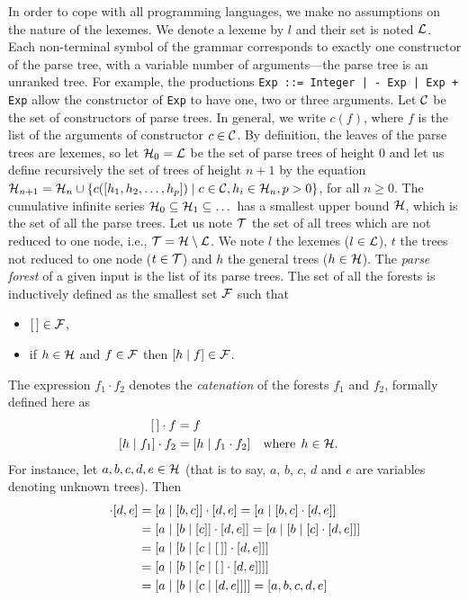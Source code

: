 In order to cope with all programming languages, we make no
assumptions on the nature of the lexemes. We denote a lexeme by \(l\)
and their set is noted \(\cal L\). Each non\hyp{}terminal symbol of
the grammar corresponds to exactly one constructor of the parse tree,
with a variable number of arguments---the parse tree is an unranked
tree. For example, the productions
\verb/Exp ::= Integer | - Exp | Exp + Exp/ allow the constructor of
\texttt{Exp} to have one, two or three arguments. Let \({\cal C}\) be
the set of constructors of parse trees. In general, we write \(c(f)\),
where \(f\) is the list of the arguments of constructor \(c \in {\cal
  C}\). By definition, the leaves of the parse trees are lexemes, so
let \({\cal H}_0 = {\cal L}\) be the set of parse trees of height
\(0\) and let us define recursively the set of trees of height \(n+1\)
by the equation \({\cal H}_{n+1} = {\cal H}_n \cup \{c([h_1, h_2,
  \dots, h_p]) \mid c \in {\cal C}, h_i \in {\cal H}_n, p > 0\}\), for
all \(n \geqslant 0\). The cumulative infinite series \({\cal H}_0
\subseteq {\cal H}_1 \subseteq \dots\) has a smallest upper bound
\(\cal H\), which is the set of all the parse trees. Let us note
\(\cal T\) the set of all trees which are not reduced to one node,
i.e., \({\cal T} = {\cal H} \setminus {\cal L}\). We note \(l\) the
lexemes (\(l \in {\cal L}\)), \(t\) the trees not reduced to one node
(\(t \in {\cal T}\)) and \(h\) the general trees (\(h \in {\cal
  H}\)). The \emph{parse forest} of a given input is the list of its
parse trees. The set of all the forests is inductively defined as the
smallest set \(\cal F\) such that
\begin{itemize}

  \item \([\,] \in {\cal F}\),

  \item if \(h \in {\cal H}\) and \(f \in {\cal F}\) then
    \([{h}\mid{f}] \in {\cal F}\).

\end{itemize}
The expression \(f_1 \cdot f_2\) denotes the \emph{catenation} of the
forests \(f_1\) and \(f_2\), formally defined here as
\begin{align}
  \el \cdot f &= f \label{model:conc:1}\\
  \cons{h}{f_1} \cdot f_2 &= \cons{h}{f_1 \cdot f_2}
  && \text{where} \;\, h \in {\cal H}. \label{model:conc:2}
\end{align}
For instance, let \(a, b, c, d, e \in {\cal H}\) (that is to say,
\(a\), \(b\), \(c\), \(d\) and \(e\) are variables denoting unknown
trees). Then
\begin{align*}
[a,b,c] \cdot [d,e] &= \cons{a}{[b,c]} \cdot [d,e] = \cons{a}{[b,c]
  \cdot [d,e]}\\
 &= \cons{a}{\cons{b}{[c]} \cdot [d,e]} = \cons{a}{\cons{b}{[c] \cdot
    [d,e]}}\\
 &= \cons{a}{\cons{b}{\cons{c}{\el} \cdot [d,e]}}\\
 &= \cons{a}{\cons{b}{\cons{c}{\el \cdot [d,e]}}}\\
 &= \cons{a}{\cons{b}{\cons{c}{[d,e]}}} = [a,b,c,d,e]
\end{align*}

